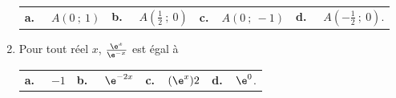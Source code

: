 \begin{enumerate}
\begin{center}
\begin{tabularx}{\linewidth}{*{4}{X}}
\textbf{a.~~} $A(0~;~1)$ &\textbf{b.~~} $A\left(\frac{1}{2}~;~0\right)$&\textbf{c.~~}$A(0~;~- 1)$& \textbf{d.~~} $A(-\frac{1}{2}~;~0)$.
\end{tabularx}
\end{center}

\item Pour tout réel $x$, $\frac{\e^x}{ \e^{-x}}$ est égal à

\begin{center}
\begin{tabularx}{\linewidth}{*{4}{X}}
\textbf{a.~~} $- 1$ &\textbf{b.~~} $ \e^{-2x}$&\textbf{c.~~}$(\e^x)2$& \textbf{d.~~}$\e^0$.
\end{tabularx}
\end{center}
\end{enumerate}

\vspace{0,5cm}
